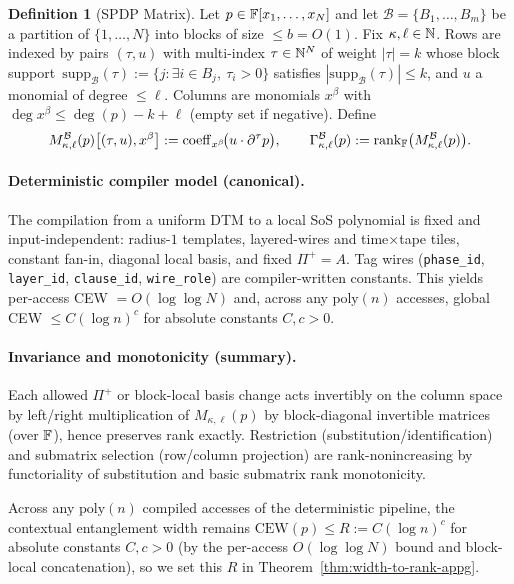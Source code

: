 \documentclass[12pt]{article}
\theoremstyle{definition}
\newtheorem{definition}{Definition}
\theoremstyle{definition}
\theoremstyle{remark}
\theoremstyle{remark}
\begin{document}
\begin{definition}[SPDP Matrix]\label{def:spdp-appg}
Let $p\in\Bbb F[x_1,\ldots,x_N]$ and let $\mathcal B=\{B_1,\ldots,B_m\}$ be a partition of $\{1,\ldots,N\}$ into blocks of size $\le b=O(1)$.
Fix $\kappa,\ell\in\Bbb N$. Rows are indexed by pairs $(\tau,u)$ with multi-index $\tau\in\Bbb N^N$ of weight $|\tau|=k$ whose block support
$\,\mathrm{supp}_{\mathcal B}(\tau):=\{j:\exists i\in B_j,\ \tau_i>0\}$ satisfies $|\mathrm{supp}_{\mathcal B}(\tau)|\le k$, and $u$ a monomial of degree $\le \ell$.
Columns are monomials $x^\beta$ with $\deg x^\beta \le \deg(p)-k+\ell$ (empty set if negative).
Define
\[
M^{\mathcal B}_{\kappa,\ell}(p)\big[(\tau,u),x^\beta\big]
:= \mathrm{coeff}_{x^\beta}\!\big(u\cdot \partial^\tau p\big),
\qquad
\Gamma^{\mathcal B}_{\kappa,\ell}(p):=\mathrm{rank}_\Bbb F\big(M^{\mathcal B}_{\kappa,\ell}(p)\big).
\]
\end{definition}

\paragraph{Deterministic compiler model (canonical).}
The compilation from a uniform DTM to a local SoS polynomial is fixed and input-independent: radius-$1$ templates, layered-wires and time$\times$tape tiles,
constant fan-in, diagonal local basis, and fixed $\Pi^+=A$. Tag wires (\texttt{phase\_id}, \texttt{layer\_id}, \texttt{clause\_id}, \texttt{wire\_role}) are compiler-written constants.
This yields per-access CEW $=O(\log\log N)$ and, across any $\mathrm{poly}(n)$ accesses, global CEW $\le C(\log n)^c$ for absolute constants $C,c>0$.

\paragraph{Invariance and monotonicity (summary).}
Each allowed $\Pi^+$ or block-local basis change acts invertibly on the column space by left/right multiplication of $M_{\kappa,\ell}(p)$ by block-diagonal invertible matrices (over $\Bbb F$), hence preserves rank exactly.
Restriction (substitution/identification) and submatrix selection (row/column projection) are rank-nonincreasing by functoriality of substitution and basic submatrix rank monotonicity.

\medskip
\noindent
Across any $\mathrm{poly}(n)$ compiled accesses of the deterministic pipeline, the contextual entanglement width remains
$\mathrm{CEW}(p)\le R := C(\log n)^c$
for absolute constants $C,c>0$ (by the per-access $O(\log\log N)$ bound and block-local concatenation), so we set this $R$ in Theorem~\ref{thm:width-to-rank-appg}.
\end{document}

